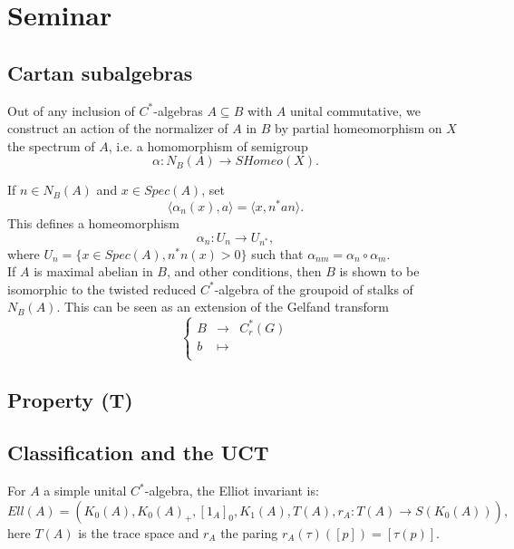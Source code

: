 \section{Seminar}

\subsection{Cartan subalgebras}

Out of any inclusion of $C^*$-algebras $A\subseteq B$ with $A$ unital commutative, we construct an action of the normalizer of $A$ in $B$ by partial homeomorphism on $X$ the spectrum of $A$, i.e. a homomorphism of semigroup  
\[\alpha: N_B(A) \rightarrow SHomeo(X).\] 

If $n\in N_B(A)$ and $x\in Spec(A)$, set 
\[\langle \alpha_n(x) , a\rangle =\langle x , n^*a n\rangle .\]
This defines a homeomorphism 
\[\alpha_n : U_n \rightarrow U_{n^*},\]
where $U_n = \{x\in Spec(A), n^*n(x) >0\}$ such that $\alpha_{nm} =\alpha_{n} \circ \alpha_{m}$.\\
 
If $A$ is maximal abelian in $B$, and other conditions, then $B$ is shown to be isomorphic to the twisted reduced $C^*$-algebra of the groupoid of stalks of $N_B(A)$. This can be seen  as an extension of the Gelfand transform
\[\left\{\begin{array}{rcl}
B & \rightarrow & C^*_r(G) \\
b & \mapsto &  \\
\end{array}\right.\] 

\subsection{Property (T)}

\subsection{Classification and the UCT}

For $A$ a simple unital $C^*$-algebra, the Elliot invariant is:
\[Ell(A) = \left( K_0(A), K_0(A)_+ , [1_A]_0 , K_1(A), T(A) , r_A : T(A) \rightarrow S(K_0(A)) \right) ,\]
here $T(A)$ is the trace space and $r_A$ the paring $r_A(\tau)([p]) = [\tau(p)]$.\\

